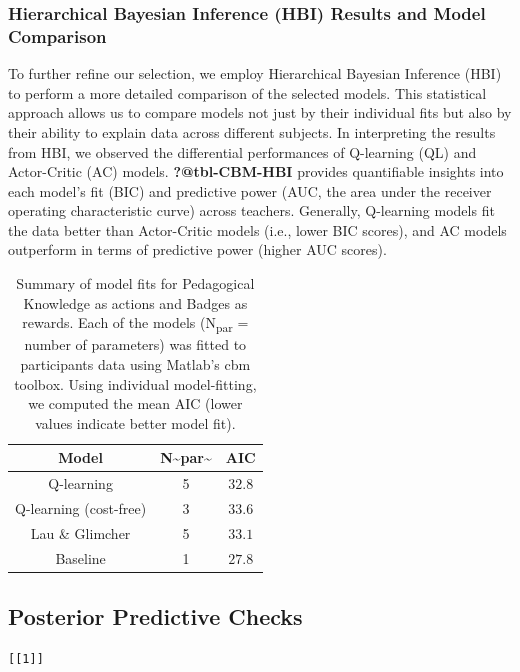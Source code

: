 \documentclass[
  number,
  preprint,
  3p,
  onecolumn]{elsarticle}
\begin{document}
\subsubsection{Hierarchical Bayesian Inference (HBI) Results and Model
Comparison}\label{hierarchical-bayesian-inference-hbi-results-and-model-comparison}

To further refine our selection, we employ Hierarchical Bayesian
Inference (HBI) to perform a more detailed comparison of the selected
models. This statistical approach allows us to compare models not just
by their individual fits but also by their ability to explain data
across different subjects. In interpreting the results from HBI, we
observed the differential performances of Q-learning (QL) and
Actor-Critic (AC) models. \textbf{?@tbl-CBM-HBI} provides quantifiable
insights into each model's fit (BIC) and predictive power (AUC, the area
under the receiver operating characteristic curve) across teachers.
Generally, Q-learning models fit the data better than Actor-Critic
models (i.e., lower BIC scores), and AC models outperform in terms of
predictive power (higher AUC scores).

\begin{longtable}{ccc}

\caption{\label{tbl-model-summary}Summary of model fits for Pedagogical
Knowledge as actions and Badges as rewards. Each of the models
(N\textsubscript{par} = number of parameters) was fitted to participants
data using Matlab's cbm toolbox. Using individual model-fitting, we
computed the mean AIC (lower values indicate better model fit).}

\tabularnewline

\toprule
Model & N\textasciitilde{}par\textasciitilde{} & AIC \\ 
\midrule\addlinespace[2.5pt]
Q-learning & 5 & $32.8$ \\ 
Q-learning (cost-free) & 3 & $33.6$ \\ 
Lau \& Glimcher & 5 & $33.1$ \\ 
Baseline & 1 & $27.8$ \\ 
\bottomrule

\end{longtable}

\subsection{Posterior Predictive
Checks}\label{posterior-predictive-checks}

\begin{verbatim}
[[1]]
\end{verbatim}
\end{document}
